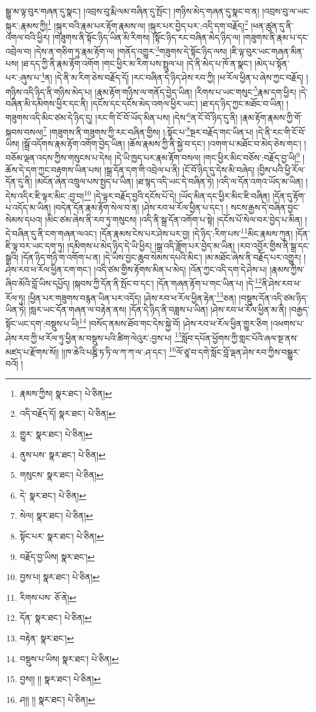 སྒྱུ་མ་ལྟ་བུར་གཞན་དུ་སྣང་། །འབྲས་བུ་རྨི་ལམ་བཞིན་དུ་སྤོང་། །གཉིས་མེད་གཞན་དུ་སྣང་བ་ན། །འབྲས་བུ་ལ་ཡང་སྐུར་:རྣམས་ཀྱི།\footnote{རྣམས་ཀྱིས།  སྣར་ཐང་།  པེ་ཅིན། } །སྐུར་བའི་རྣམ་པར་རྟོག་རྣམས་ལ། །སྐུར་པར་བྱེད་པར་:འདི་དག་བརྗོད།\footnote{འདི་བརྗོད་དོ།  སྣར་ཐང་།  པེ་ཅིན། } །ཕན་ཚུན་དུ་ནི་འགལ་བའི་ཕྱིར། །གཟུགས་ནི་སྟོང་ཉིད་ཡིན་མི་རིགས། །སྟོང་ཉིད་རང་བཞིན་མེད་ཉིད་ལ། །གཟུགས་ནི་རྣམ་པ་དང་འབྲེལ་བ། །དེས་ན་གཅིག་ཏུ་རྣམ་རྟོག་ལ། །གནོད་འགྱུར་\footnote{གྱུར་  སྣར་ཐང་།  པེ་ཅིན། }གཟུགས་དེ་སྟོང་ཉིད་ལས། །ཇི་ལྟ་བུར་ཡང་གཞན་མིན་པས། །ཐ་དད་ཀྱི་ནི་རྣམ་རྟོག་འགོག །གང་ཕྱིར་མ་རིག་པས་སྤྲུལ་པ། །དེ་ནི་མེད་པ་ཁོ་ན་སྣང་། །མེད་པ་སྟོན་པར་:ཞུས་པ་\footnote{ནུས་པས་  སྣར་ཐང་།  པེ་ཅིན། }ན། །དེ་ནི་མ་རིག་ཅེས་བརྗོད་དོ། །རང་བཞིན་དེ་ཉིད་ཤེས་རབ་ཀྱི། །ཕ་རོལ་ཕྱིན་པ་ཞེས་ཀྱང་བརྗོད། །གཉིས་འདི་ཉིད་ནི་གཉིས་མེད་པ། །རྣམ་རྟོག་གཉིས་ལ་གནོད་བྱེད་ཡིན། །རིགས་པ་ཡང་གསུང་\footnote{གསུངས་  སྣར་ཐང་།  པེ་ཅིན། }རྣམ་དག་ཕྱིར། །དེ་བཞིན་མི་དམིགས་ཕྱིར་དང་ནི། །དངོས་དང་དངོས་མེད་འགལ་ཕྱིར་ཡང་། །ཐ་དད་ཉིད་ཀྱང་མཐོང་བ་ཡིན། །གཟུགས་འདི་མིང་ཙམ་དེ་ཉིད་དུ། །རང་གི་ངོ་བོ་ཡོད་མིན་པས། །དེས་\footnote{དེ་  སྣར་ཐང་།  པེ་ཅིན། }ན་ངོ་བོ་ཉིད་དུ་ནི། །རྣམ་རྟོག་རྣམས་ཀྱི་གོ་སྐབས་བསལ།\footnote{སེལ།  སྣར་ཐང་།  པེ་ཅིན། } །གཟུགས་ནི་གཟུགས་ཀྱི་རང་བཞིན་གྱིས། །:སྟོང་པ་\footnote{སྟོང་པར་  སྣར་ཐང་།  པེ་ཅིན། }སྔར་བརྗོད་གང་ཡིན་པ། །དེ་ནི་རང་གི་ངོ་བོ་ཡིས། །སྒྲོ་འདོགས་རྣམ་རྟོག་འགོག་བྱེད་ཡིན། །ཆོས་རྣམས་ཀྱི་ནི་སྐྱེ་བ་དང་། །འགག་པ་མཐོང་བ་མེད་ཅེས་གང་། །བཅོམ་ལྡན་འདས་ཀྱིས་གསུངས་པ་དེས། །དེ་ཡི་ཁྱད་པར་རྣམ་རྟོག་བསལ། །གང་ཕྱིར་མིང་བཅོས་:བརྗོད་བྱ་ཡི།\footnote{བརྗོད་བྱ་ཡིས།  སྣར་ཐང་། } །ཆོས་དེ་དག་ཀྱང་བརྟགས་ཡིན་པས། །སྒྲ་དོན་དག་གི་འབྲེལ་པ་ནི། །ངོ་བོ་ཉིད་དུ་དེས་མི་བཞེད། །བྱིས་པའི་ཕྱི་རོལ་དོན་དུ་ནི། །མངོན་ཞེན་འཁྲུལ་པས་སྤྱད་པ་ཡིན། །ཐ་སྙད་འདི་ཡང་དེ་བཞིན་ཏེ། །འདི་ལ་དོན་འགའ་ཡོད་མ་ཡིན། །དེས་འདིར་ཇི་ལྟར་མིང་:བྱ་བ།\footnote{བྱས་པ།  སྣར་ཐང་།  པེ་ཅིན། } །དེ་ལྟར་བརྗོད་བྱའི་དངོས་པོ་དེ། །ཡོད་མིན་དང་ཕྱིར་མིང་ཇི་བཞིན། །དོན་དུ་རྟོག་པ་འདོད་མ་ཡིན། །བདེན་དོན་རྣམ་རྟོག་སེལ་བ་ན། །ཤེས་རབ་ཕ་རོལ་ཕྱིན་པ་དང་། །
སངས་རྒྱས་དེ་བཞིན་བྱང་སེམས་དཔའ། །མིང་ཙམ་ཞེས་ནི་རབ་ཏུ་གསུངས། །འདི་ནི་སྒྲ་དོན་འགོག་པ་སྟེ། །དངོས་པོ་སེལ་བར་བྱེད་པ་མིན། །དེ་བཞིན་དུ་ནི་ངག་གཞན་ལའང་། །དོན་རྣམས་ངེས་པར་ཤེས་པར་བྱ། །དེ་ཉིད་:རིག་པས་\footnote{རིགས་པས་  ཅོ་ནེ། }མིང་རྣམས་ཀུན། །དོན་ཇི་ལྟ་བར་ཡང་དག་ཏུ། །དམིགས་པ་མེད་ཉིད་དེ་ཡི་ཕྱིར། །སྒྲ་འདི་ཟློག་པར་བྱེད་མ་ཡིན། །རབ་འབྱོར་གྱིས་ནི་སྒྲ་དང་སྒྲའི། །དོན་ཉིད་གཉི་ག་འགོག་པ་ན། །དེ་ཡིས་བྱང་ཆུབ་སེམས་དཔའི་མིང་། །མ་མཐོང་ཞེས་ནི་བརྗོད་པར་འགྱུར། །ཤེས་རབ་ཕ་རོལ་ཕྱིན་ངག་གང་། །འདི་ཙམ་གྱིས་རྟོགས་མིན་པ་མེད། །འོན་ཀྱང་འདི་དག་དེ་ཤེས་པ། །རྣམས་ཀྱིས་ཞིབ་མོའི་བློ་ཡིས་དཔྱོད། །སྐབས་ཀྱི་དོན་ནི་སྤོང་བ་དང་། །དོན་གཞན་རྟོག་པ་གང་ཡིན་པ། །དེ་\footnote{དོན་  སྣར་ཐང་།  པེ་ཅིན། }ནི་ཤེས་རབ་ཕ་རོལ་ཏུ། །ཕྱིན་པར་གཟུགས་བརྙན་ཡིན་པར་འདོད། །ཤེས་རབ་ཕ་རོལ་ཕྱིན་རྟེན་\footnote{བརྟེན་  སྣར་ཐང་། }ཅན། །བསྡུས་དོན་འདི་ཙམ་ཉིད་ཡིན་ཏེ། །སླར་ཡང་དོན་གཞན་ལ་བརྟེན་ནས། །དོན་དེ་ཉིད་ནི་བཟླས་པ་ཡིན། །ཤེས་རབ་ཕ་རོལ་ཕྱིན་མ་ནི། །བརྒྱད་སྟོང་ཡང་དག་:བསྡུས་པ་ཡི།\footnote{བསྡུས་པ་ཡིས།  སྣར་ཐང་།  པེ་ཅིན། } །བསོད་ནམས་ཐོབ་གང་དེས་སྐྱེ་བོ། །ཤེས་རབ་ཕ་རོལ་ཕྱིན་གྱུར་ཅིག །འཕགས་པ་ཤེས་རབ་ཀྱི་ཕ་རོལ་ཏུ་ཕྱིན་མ་བསྡུས་པའི་ཚིག་ལེའུར་:བྱས་པ། \footnote{བྱས།། །།   སྣར་ཐང་།  པེ་ཅིན། }སློབ་དཔོན་ཕྱོགས་ཀྱི་གླང་པོའི་ཞལ་སྔ་ནས་མཛད་པ་རྫོགས་སོ།། །།ཁ་ཆེའི་པཎྜི་ཏ་ཏི་ལ་ཀ་ཀ་ལ་:ཤ་དང་། \footnote{ཤ།། །།   སྣར་ཐང་།  པེ་ཅིན། }ལོ་ཙཱ་བ་དགེ་སློང་བློ་ལྡན་ཤེས་རབ་ཀྱིས་བསྒྱུར་བའོ། ། 